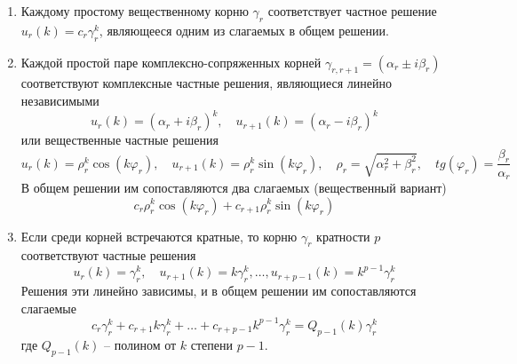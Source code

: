 \begin{enumerate}
    \item Каждому простому вещественному корню $\displaystyle \gamma_r$ соответствует частное решение
    $\displaystyle u_r(k) = c_r\gamma_r^k$, являющееся одним из слагаемых в общем решении.
    \item Каждой простой паре комплексно-сопряженных корней $\displaystyle \gamma_{r, r+1} = \left( \alpha_r \pm i\beta_r \right)$
    соответствуют комплексные частные решения, являющиеся линейно независимыми
    \begin{equation*}
        u_r(k) = \left( \alpha_r + i\beta_r \right)^k, \quad u_{r+1}(k) = \left( \alpha_r - i\beta_r \right)^k
    \end{equation*}
    или вещественные частные решения
    \begin{equation*}
        u_r(k) = \rho_r^k \cos(k\varphi_r), \quad u_{r+1}(k) = \rho_r^k \sin(k\varphi_r), \quad \rho_r = \sqrt{\alpha_r^2 + \beta_r^2}, \quad tg(\varphi_r) = \frac{\beta_r}{\alpha_r}
    \end{equation*}
    В общем решении им сопоставляются два слагаемых (вещественный вариант)
    \begin{equation*}
        c_r \rho_r^k \cos(k\varphi_r) + c_{r+1}\rho_r^k \sin(k\varphi_r)
    \end{equation*}
    \item Если среди корней встречаются кратные, то корню $\gamma_r$ кратности $p$ соответствуют частные решения
    \begin{equation*}
        u_r(k) = \gamma_r^k, \quad u_{r+1}(k) = k\gamma_r^k, \dots, u_{r+p-1}(k) = k^{p-1}\gamma_r^k
    \end{equation*}
    Решения эти линейно зависимы, и в общем решении им сопоставляются слагаемые
    \begin{equation*}
        c_r\gamma_r^k + c_{r+1}k\gamma_r^k + \dots + c_{r+p-1}k^{p-1}\gamma_r^k = Q_{p-1}(k)\gamma_r^k
    \end{equation*}
    где $\displaystyle Q_{p-1}(k)$ -- полином от $k$ степени $p-1$.
\end{enumerate}
